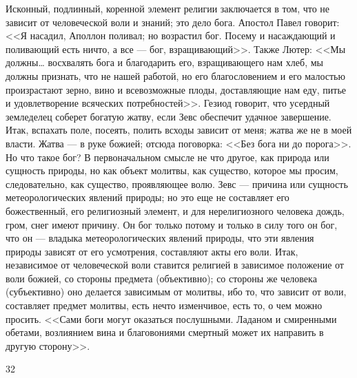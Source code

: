 \documentclass[12pt]{article}
\begin{document}
Исконный, подлинный, коренной элемент религии заключается в том, что не зависит от человеческой воли и знаний; это дело бога. Апостол Павел говорит: <<Я насадил, Аполлон поливал; но возрастил бог. Посему и насаждающий и поливающий есть ничто, а все --- бог, взращивающий>>. Также Лютер: <<Мы должны… восхвалять бога и благодарить его, взращивающего нам хлеб, мы должны признать, что не нашей работой, но его благословением и его малостью произрастают зерно, вино и всевозможные плоды, доставляющие нам еду, питье и удовлетворение всяческих потребностей>>. Гезиод говорит, что усердный земледелец соберет богатую жатву, если Зевс обеспечит удачное завершение. Итак, вспахать поле, посеять, полить всходы зависит от меня; жатва же не в моей власти. Жатва --- в руке божией; отсюда поговорка: <<Без бога ни до порога>>. Но что такое бог? В первоначальном смысле не что другое, как природа или сущность природы, но как объект молитвы, как существо, которое мы просим, следовательно, как существо, проявляющее волю. Зевс --- причина или сущность метеорологических явлений природы; но это еще не составляет его божественный, его религиозный элемент, и для нерелигиозного человека дождь, гром, снег имеют причину. Он бог только потому и только в силу того он бог, что он --- владыка метеорологических явлений природы, что эти явления природы зависят от его усмотрения, составляют акты его воли. Итак, независимое от человеческой воли ставится религией в зависимое положение от воли божией, со стороны предмета (объективно); со стороны же человека (субъективно) оно делается зависимым от молитвы, ибо то, что зависит от воли, составляет предмет молитвы, есть нечто изменчивое, есть то, о чем можно просить. <<Сами боги могут оказаться послушными. Ладаном и смиренными обетами, возлиянием вина и благовониями смертный может их направить в другую сторону>>.



32
\end{document}
